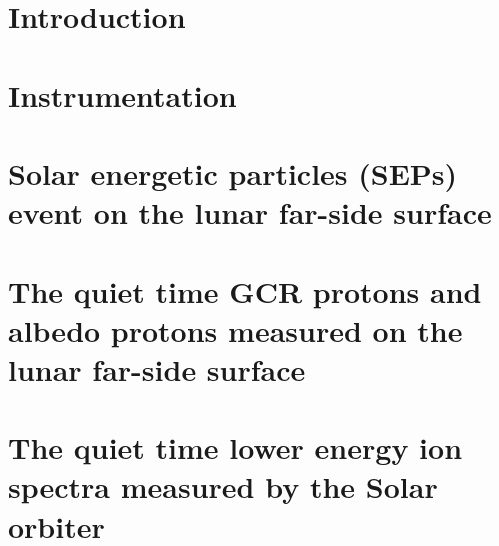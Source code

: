 \documentclass[ twoside,openright,titlepage,numbers=noenddot,headinclude,%
footinclude=true,cleardoublepage=empty,abstractoff, %
BCOR=12mm,paper=a4,fontsize=11pt,%
ngerman,american]{scrreprt} %
\begin{document}
\frenchspacing
\raggedbottom
{} %
\pagestyle{plain}



\cleardoublepage

\cleardoublepage

%
\cleardoublepage



\cleardoublepage
{}
\setcounter{page}{1}	

\chapter{Introduction}
\label{chp:introduction}



\chapter{Instrumentation}
\label{chp:instruments}



\chapter{Solar energetic particles (SEPs) event on the lunar far-side surface}
\label{chp:LND_SEP}



\chapter{The quiet time GCR protons and albedo protons measured on the lunar far-side surface}
\label{chp:LND_GCR_albedo}



\chapter{The quiet time lower energy ion spectra measured by the Solar orbiter}
\label{chp:SOLO_Quite_time}


\end{document}
